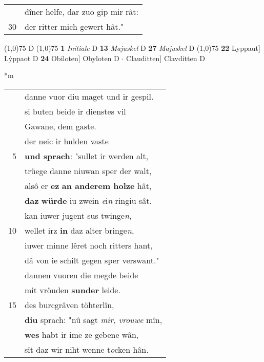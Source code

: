 \documentclass[8pt,a4paper,notitlepage]{article}
\begin{document}
\begin{table}[ht]
\begin{minipage}[t]{0.5\linewidth}
\begin{tabular}{rl}
 & dîner helfe, dar zuo gip mir rât:\\ 
30 & der ritter mich gewert hât."\\ 
\end{tabular}
\scriptsize
\line(1,0){75} \newline
D \newline
\line(1,0){75} \newline
\textbf{1} \textit{Initiale} D  \textbf{13} \textit{Majuskel} D  \textbf{27} \textit{Majuskel} D  \newline
\line(1,0){75} \newline
\textbf{22} Lyppaut] Lẏppaot D \textbf{24} Obiloten] Obyloten D  $\cdot$ Clauditten] Clavditten D \newline
\end{minipage}
\hspace{0.5cm}
\begin{minipage}[t]{0.5\linewidth}
\small
\begin{center}*m
\end{center}
\begin{tabular}{rl}
 & danne vuor diu maget und ir gespil.\\ 
 & si buten beide ir dienstes vil\\ 
 & Gawane, dem gaste.\\ 
 & der neic ir hulden vaste\\ 
5 & \textbf{und sprach}: "sullet ir werden alt,\\ 
 & trüege danne niuwan sper der walt,\\ 
 & alsô er \textbf{ez} \textbf{an anderem holze} hât,\\ 
 & \textbf{daz} \textbf{würde} iu zwein \textit{e}i\textit{n} ringiu sât.\\ 
 & kan iuwer jugent sus twinge\textit{n},\\ 
10 & wellet irz \textbf{in} daz alter bringe\textit{n},\\ 
 & iuwer minne lêret noch ritters hant,\\ 
 & dâ von ie schilt gegen sper verswant."\\ 
 & dannen vuoren die megde beide\\ 
 & mit vröuden \textbf{sunder} leide.\\ 
15 & des burcgrâven töhterlîn,\\ 
 & \textbf{diu} sprach: "nû sagt \textit{mir, vrouwe} mîn,\\ 
 & \textbf{wes} habt ir ime ze gebene wân,\\ 
 & sît daz wir niht wenne t\textit{o}cken hân.\\ 

\end{tabular}
\end{minipage}
\end{table}
\end{document}

